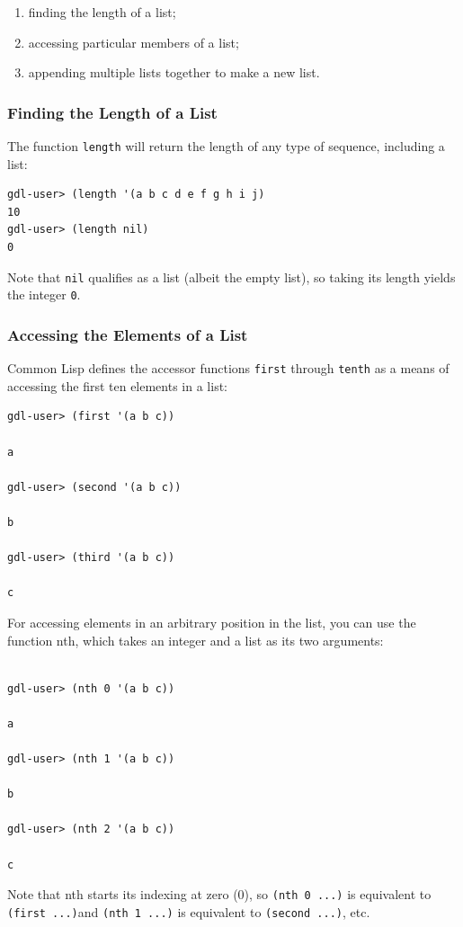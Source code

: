 \documentclass [11pt]{book}
\begin{document}
\begin{enumerate}

\item finding the length of a list;

\item accessing particular members of a list;

\item appending multiple lists together to make a new list.

\end{enumerate}



\subsubsection{Finding the Length of a List}

\label{subsubsec:findingthelengthofalist}

The function \texttt{length} will return the length of any type of sequence, including a list:

\begin{verbatim}gdl-user> (length '(a b c d e f g h i j)
10
gdl-user> (length nil)
0
\end{verbatim}Note that \texttt{nil} qualifies as a list (albeit the empty list), so taking its length yields the integer \texttt{0}.

\subsubsection{Accessing the Elements of a List}

\label{subsubsec:accessingtheelementsofalist}

Common Lisp defines the accessor functions \texttt{first} through \texttt{tenth} as a means of accessing the first ten elements in a list:

\begin{verbatim}
gdl-user> (first '(a b c))

a

gdl-user> (second '(a b c))

b

gdl-user> (third '(a b c))

c
\end{verbatim}For accessing elements in an arbitrary position in the list, you can use the function nth,
which takes an integer and a list as its two arguments:

\begin{verbatim}

gdl-user> (nth 0 '(a b c))

a

gdl-user> (nth 1 '(a b c))

b

gdl-user> (nth 2 '(a b c))

c
\end{verbatim}Note that nth starts its indexing at zero (0), so \texttt{(nth 0 ...)} is equivalent to \texttt{(first ...)}and \texttt{(nth 1 ...)} is equivalent to \texttt{(second ...)}, etc.
\end{document}
